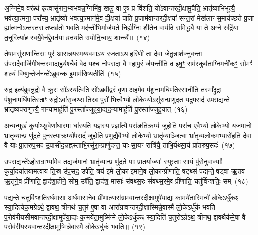 अ॒ग्निमे॒व वरू॑थं कृ॒त्वासु॑रान॒भ्य॑भवन्न॒ग्निमि॑व॒ खलु॒ वा ए॒ष प्र वि॑शति॒ यो॑\-ऽवान्तरदी॒क्षामु॒पैति॒ भ्रातृ॑व्याभिभूत्यै॒ भव॑त्या॒त्मना॒ परा᳚स्य॒ भ्रातृ॑व्यो भवत्या॒त्मान॑मे॒व दी॒क्षया॑ पाति प्र॒जाम॑वान्तरदी॒क्षया॑ सन्त॒रां मेख॑लाꣳ स॒माय॑च्छते प्र॒जा ह्या᳚त्मनो\-ऽन्त॑रतरा त॒प्तव्र॑तो भवति॒ मद॑न्तीभिर्मार्जयते॒ निर्\mbox{}ह्य॑ग्निः शी॒तेन॒ वाय॑ति॒ समि॑द्ध्यै॒ या ते॑ अग्ने॒ रुद्रि॑या त॒नूरित्या॑ह॒ स्वयै॒वैन॑द्दे॒वत॑या व्रतयति सयोनि॒त्वाय॒ शान्त्यै᳚॥~(१४)

{\anuvakamend[{यो वा ओज॑ आह॒ यद॑शी॒येति॒ ते᳚\-ऽग्न॒ एका॑\-दश च}]}%

तेषा॒मसु॑राणान्ति॒स्रः पुर॑ आसन्नय॒स्मय्य॑व॒मा\-ऽथ॑ रज॒ता\-ऽथ॒ हरि॑णी॒ ता दे॒वा जेतु॒न्नाश॑क्नुव॒न्ता उ॑प॒सदै॒वाजि॑गीष॒न्तस्मा॑दाहु॒र्यश्चै॒वं वेद॒ यश्च॒ नोप॒सदा॒ वै म॑हापु॒रं ज॑य॒न्तीति॒ त इषु॒ꣳ॒ सम॑स्कुर्वता॒ग्निमनी॑क॒ꣳ॒ सोमꣳ॑ श॒ल्यं विष्णु॒न्तेज॑न॒न्ते᳚\-ऽब्रुव॒न्क इ॒माम॑सिष्य॒तीति॑~(१५)

रु॒द्र इत्य॑ब्रुवन्रु॒द्रो वै क्रू॒रः सो᳚\-ऽस्य॒त्विति॒ सो᳚\-ऽब्रवी॒द्वरं॑ वृणा अ॒हमे॒व प॑शू॒नामधि॑पतिरसा॒नीति॒ तस्मा᳚द्रु॒द्रः प॑शू॒नामधि॑पति॒स्ताꣳ रु॒द्रो\-ऽवा॑सृज॒थ्स ति॒स्रः पुरो॑ भि॒त्त्वैभ्यो लो॒केभ्यो\-ऽसु॑रा॒न्प्राणु॑दत॒ यदु॑प॒सद॑ उपस॒द्यन्ते॒ भ्रातृ॑व्यपराणुत्त्यै॒ नान्यामाहु॑तिं पु॒रस्ता᳚ज्जुहुया॒द्यद॒न्यामाहु॑तिं पु॒रस्ता᳚ज्जुहु॒यात्~(१६)

अ॒न्यन्मुखं॑ कुर्याथ्स्रु॒वेणा॑घा॒रमा घा॑रयति य॒ज्ञस्य॒ प्रज्ञा᳚त्यै॒ परा॑ङति॒क्रम्य॑ जुहोति॒ परा॑च ए॒वैभ्यो लो॒केभ्यो॒ यज॑मानो॒ भ्रातृ॑व्या॒न्प्र णु॑दते॒ पुन॑रत्या॒क्रम्यो॑प॒सदं॑ जुहोति प्र॒णुद्यै॒वैभ्यो लो॒केभ्यो॒ भ्रातृ॑व्याञ्जि॒त्वा भ्रा॑तृव्यलो॒कम॒भ्यारो॑हति दे॒वा वै याः प्रा॒तरु॑प॒सद॑ उ॒पासी॑द॒न्नह्न॒स्ताभि॒रसु॑रा॒न्प्राणु॑दन्त॒ याः सा॒यꣳ रात्रि॑यै॒ ताभि॒र्यथ्सा॒यं प्रा॑तरुप॒सदः॑~(१७)

उ॒प॒स॒द्यन्ते॑\-ऽहोरा॒त्राभ्या॑मे॒व तद्यज॑मानो॒ भ्रातृ॑व्या॒न्प्र णु॑दते॒ याः प्रा॒तर्या॒ज्याः᳚ स्युस्ताः सा॒यं पु॑रोनुवा॒क्याः᳚ कुर्या॒दया॑तयामत्वाय ति॒स्र उ॑प॒सद॒ उपै॑ति॒ त्रय॑ इ॒मे लो॒का इ॒माने॒व लो॒कान्प्री॑णाति॒ षट्थ्सं प॑द्यन्ते॒ षड्वा ऋ॒तव॑ ऋ॒तूने॒व प्री॑णाति॒ द्वाद॑शा॒हीने॒ सोम॒ उपै॑ति॒ द्वाद॑श॒ मासाः᳚ संवथ्स॒रः सं॑वथ्स॒रमे॒व प्री॑णाति॒ चतु॑र्विꣳशतिः॒ सम्~(१८)

प॒द्य॒न्ते॒ चतु॑र्विꣳशतिरर्धमा॒सा अ॑र्धमा॒साने॒व प्री॑णा॒त्यारा᳚ग्रामवान्तरदी॒क्षामुपे॑या॒द्यः का॒मये॑ता॒स्मिन्मे॑ लो॒के\-ऽर्धु॑कꣴ स्या॒दित्येक॒मग्रे\-ऽथे॒ द्वावथ॒ त्रीनथ॑ च॒तुर॑ ए॒षा वा आरा᳚ग्रावान्तरदी॒क्षास्मिन्ने॒वास्मै॑ लो॒के\-ऽर्धु॑कं भवति प॒रोव॑रीयसीमवान्तरदी॒क्षामुपे॑या॒द्यः का॒मये॑ता॒मुष्मि॑न्मे लो॒के\-ऽर्धु॑कꣴ स्या॒दिति॑ च॒तुरो\-ऽग्रे\-ऽथ॒ त्रीनथ॒ द्वावथैक॑मे॒षा वै प॒रोव॑रीयस्यवान्तरदी॒क्षामुष्मि॑न्ने॒वास्मै॑ लो॒के\-ऽर्धु॑कं भवति॥~(१९)

